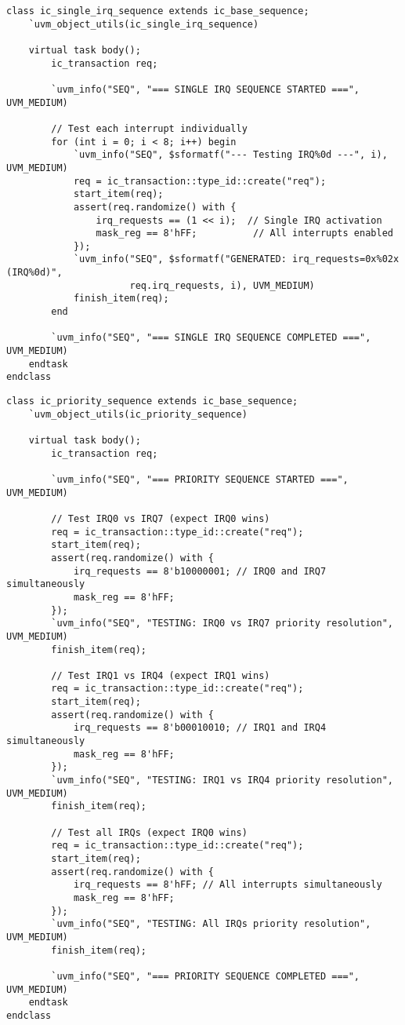 \documentclass[12pt,a4paper]{article}
\begin{document}
\begin{lstlisting}[caption=Single IRQ Test Sequence, label=lst:single_seq]
class ic_single_irq_sequence extends ic_base_sequence;
    `uvm_object_utils(ic_single_irq_sequence)
    
    virtual task body();
        ic_transaction req;
        
        `uvm_info("SEQ", "=== SINGLE IRQ SEQUENCE STARTED ===", UVM_MEDIUM)
        
        // Test each interrupt individually
        for (int i = 0; i < 8; i++) begin
            `uvm_info("SEQ", $sformatf("--- Testing IRQ%0d ---", i), UVM_MEDIUM)
            req = ic_transaction::type_id::create("req");
            start_item(req);
            assert(req.randomize() with {
                irq_requests == (1 << i);  // Single IRQ activation
                mask_reg == 8'hFF;          // All interrupts enabled
            });
            `uvm_info("SEQ", $sformatf("GENERATED: irq_requests=0x%02x (IRQ%0d)", 
                      req.irq_requests, i), UVM_MEDIUM)
            finish_item(req);
        end
        
        `uvm_info("SEQ", "=== SINGLE IRQ SEQUENCE COMPLETED ===", UVM_MEDIUM)
    endtask
endclass
\end{lstlisting}

\begin{lstlisting}[caption=Priority Test Sequence, label=lst:priority_seq]
class ic_priority_sequence extends ic_base_sequence;
    `uvm_object_utils(ic_priority_sequence)
    
    virtual task body();
        ic_transaction req;
        
        `uvm_info("SEQ", "=== PRIORITY SEQUENCE STARTED ===", UVM_MEDIUM)
        
        // Test IRQ0 vs IRQ7 (expect IRQ0 wins)
        req = ic_transaction::type_id::create("req");
        start_item(req);
        assert(req.randomize() with {
            irq_requests == 8'b10000001; // IRQ0 and IRQ7 simultaneously
            mask_reg == 8'hFF;
        });
        `uvm_info("SEQ", "TESTING: IRQ0 vs IRQ7 priority resolution", UVM_MEDIUM)
        finish_item(req);
        
        // Test IRQ1 vs IRQ4 (expect IRQ1 wins)
        req = ic_transaction::type_id::create("req");
        start_item(req);
        assert(req.randomize() with {
            irq_requests == 8'b00010010; // IRQ1 and IRQ4 simultaneously
            mask_reg == 8'hFF;
        });
        `uvm_info("SEQ", "TESTING: IRQ1 vs IRQ4 priority resolution", UVM_MEDIUM)
        finish_item(req);
        
        // Test all IRQs (expect IRQ0 wins)
        req = ic_transaction::type_id::create("req");
        start_item(req);
        assert(req.randomize() with {
            irq_requests == 8'hFF; // All interrupts simultaneously
            mask_reg == 8'hFF;
        });
        `uvm_info("SEQ", "TESTING: All IRQs priority resolution", UVM_MEDIUM)
        finish_item(req);
        
        `uvm_info("SEQ", "=== PRIORITY SEQUENCE COMPLETED ===", UVM_MEDIUM)
    endtask
endclass
\end{lstlisting}
\end{document}
